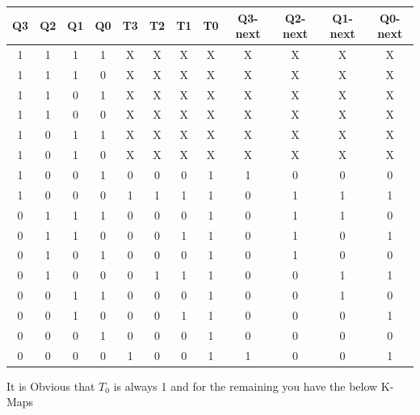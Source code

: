 \documentclass[a4paper,12pt]{article}
\begin{document}
\begin{table}[H]
        \begin{tabular}{|c|c|c|c|c|c|c|c|c|c|c|c|}
                \hline
		\textbf{Q3} & \textbf{Q2} & \textbf{Q1} & \textbf{Q0} & \textbf{T3} & \textbf{T2} & \textbf{T1} & \textbf{T0} & \textbf{Q3-next} & \textbf{Q2-next} & \textbf{Q1-next} & \textbf{Q0-next} \\
                \hline
                1 & 1 & 1 & 1 & X & X & X & X & X & X & X & X \\
                \hline
                1 & 1 & 1 & 0 & X & X & X & X & X & X & X & X \\
                \hline
                1 & 1 & 0 & 1 & X & X & X & X & X & X & X & X \\
                \hline
                1 & 1 & 0 & 0 & X & X & X & X & X & X & X & X \\
                \hline
                1 & 0 & 1 & 1 & X & X & X & X & X & X & X & X \\
                \hline
                1 & 0 & 1 & 0 & X & X & X & X & X & X & X & X \\
                \hline
		1 & 0 & 0 & 1 & 0 & 0 & 0 & 1 & 1 & 0 & 0 & 0 \\
                \hline
		1 & 0 & 0 & 0 & 1 & 1 & 1 & 1 & 0 & 1 & 1 & 1 \\
		\hline
		0 & 1 & 1 & 1 & 0 & 0 & 0 & 1 & 0 & 1 & 1 & 0 \\
		\hline
		0 & 1 & 1 & 0 & 0 & 0 & 1 & 1 & 0 & 1 & 0 & 1 \\
		\hline
		0 & 1 & 0 & 1 & 0 & 0 & 0 & 1 & 0 & 1 & 0 & 0 \\
		\hline
		0 & 1 & 0 & 0 & 0 & 1 & 1 & 1 & 0 & 0 & 1 & 1 \\
		\hline
		0 & 0 & 1 & 1 & 0 & 0 & 0 & 1 & 0 & 0 & 1 & 0 \\
		\hline
		0 & 0 & 1 & 0 & 0 & 0 & 1 & 1 & 0 & 0 & 0 & 1 \\
		\hline
		0 & 0 & 0 & 1 & 0 & 0 & 0 & 1 & 0 & 0 & 0 & 0 \\
		\hline
		0 & 0 & 0 & 0 & 1 & 0 & 0 & 1 & 1 & 0 & 0 & 1 \\
		\hline
        \end{tabular}
\end{table}
It is Obvious that $T_0$ is always 1 and for the remaining you have the below K-Maps
\end{document}
